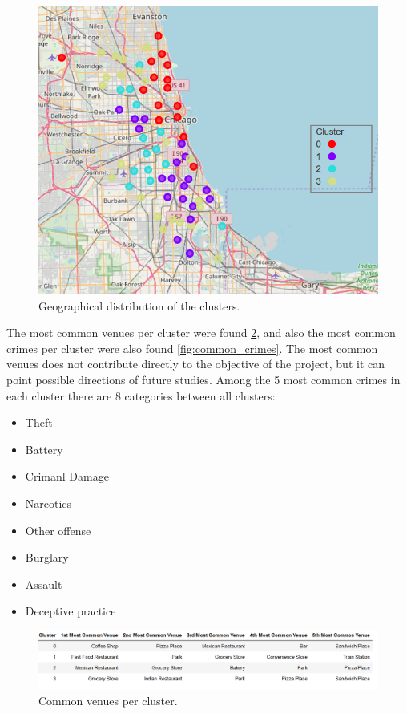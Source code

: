 \documentclass[a4paper,12pt]{article}
\begin{document}
\begin{figure}[hb]
 \centering
\includegraphics[scale=1]{Cluster_map_chicago}
\caption{Geographical distribution of the clusters. 
\label{fig:map_cluster}}
\end{figure} 

The most common venues per cluster were found \ref{fig:common_venues}, and also the most common crimes per cluster were also found \ref{fig:common_crimes}. The most common venues does not contribute directly to the objective of the project, but it can point possible directions of future studies. Among the 5 most common crimes in each cluster there are 8 categories between all clusters:
\begin{itemize}
\item Theft
\item Battery
\item Crimanl Damage
\item Narcotics
\item Other offense
\item Burglary
\item Assault
\item Deceptive practice

\end{itemize}

\begin{figure}[hb]
 \centering
\includegraphics[scale=1]{Common_venues_per_cluster}
\caption{Common venues per cluster. 
\label{fig:common_venues}}
\end{figure}   
\end{document}
